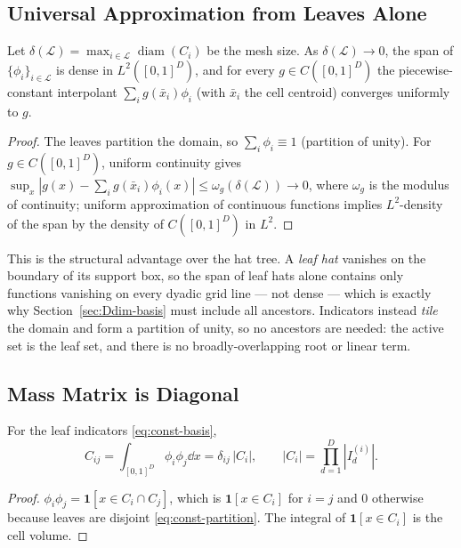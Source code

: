 \documentclass[11pt]{article}
\begin{document}
\subsection{Universal Approximation from Leaves Alone}
\label{sec:const-ufa}

\begin{proposition}
\label{prop:const-ufa}
Let $\delta(\mathcal{L})=\max_{i\in\mathcal{L}}\operatorname{diam}(C_i)$ be the
mesh size.  As $\delta(\mathcal{L})\to0$, the span of $\{\phi_i\}_{i\in\mathcal{L}}$
is dense in $L^2([0,1]^D)$, and for every $g\in C([0,1]^D)$ the piecewise-constant
interpolant $\sum_i g(\bar x_i)\phi_i$ (with $\bar x_i$ the cell centroid)
converges uniformly to $g$.
\end{proposition}
\begin{proof}
The leaves partition the domain, so $\sum_i\phi_i\equiv1$ (partition of unity).
For $g\in C([0,1]^D)$, uniform continuity gives
$\sup_x|g(x)-\sum_i g(\bar x_i)\phi_i(x)|\le\omega_g(\delta(\mathcal{L}))\to0$,
where $\omega_g$ is the modulus of continuity; uniform approximation of
continuous functions implies $L^2$-density of the span by the density of
$C([0,1]^D)$ in $L^2$.
\end{proof}

\begin{remark}
This is the structural advantage over the hat tree.  A \emph{leaf hat} vanishes
on the boundary of its support box, so the span of leaf hats alone contains only
functions vanishing on every dyadic grid line --- not dense --- which is exactly
why Section~\ref{sec:Ddim-basis} must include all ancestors.  Indicators instead
\emph{tile} the domain and form a partition of unity, so no ancestors are needed:
the active set is the leaf set, and there is no broadly-overlapping root or
linear term.
\end{remark}

\subsection{Mass Matrix is Diagonal}
\label{sec:const-mass}

\begin{proposition}
\label{prop:const-mass}
For the leaf indicators \eqref{eq:const-basis},
\begin{equation}
  C_{ij} = \int_{[0,1]^D}\phi_i\phi_j\dd x
         = \delta_{ij}\,|C_i|,
  \qquad
  |C_i| = \prod_{d=1}^D |I_d^{(i)}|.
  \label{eq:const-mass}
\end{equation}
\end{proposition}
\begin{proof}
$\phi_i\phi_j=\mathbf{1}[x\in C_i\cap C_j]$, which is $\mathbf{1}[x\in C_i]$ for
$i=j$ and $0$ otherwise because leaves are disjoint \eqref{eq:const-partition}.
The integral of $\mathbf{1}[x\in C_i]$ is the cell volume.
\end{proof}
\end{document}
